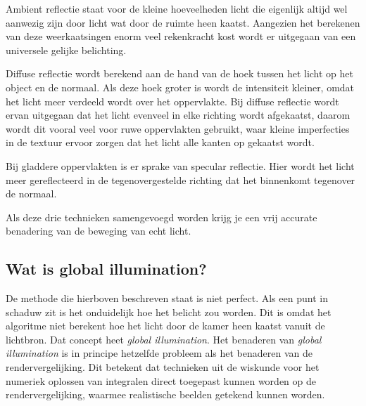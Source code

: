 \documentclass[12pt, a4paper]{article}
\begin{document}
Ambient reflectie staat voor de kleine hoeveelheden licht die eigenlijk altijd wel aanwezig zijn door licht wat door de ruimte heen kaatst. Aangezien het berekenen van deze weerkaatsingen enorm veel rekenkracht kost wordt er uitgegaan van een universele gelijke belichting. 

Diffuse reflectie wordt berekend aan de hand van de hoek tussen het licht op het object en de normaal. Als deze hoek groter is wordt de intensiteit kleiner, omdat het licht meer verdeeld wordt over het oppervlakte. Bij diffuse reflectie wordt ervan uitgegaan dat het licht evenveel in elke richting wordt afgekaatst, daarom wordt dit vooral veel voor ruwe oppervlakten gebruikt, waar kleine imperfecties in de textuur ervoor zorgen dat het licht alle kanten op gekaatst wordt.

Bij gladdere oppervlakten is er sprake van specular reflectie. Hier wordt het licht meer gereflecteerd in de tegenovergestelde richting dat het binnenkomt tegenover de normaal. 

Als deze drie technieken samengevoegd worden krijg je een vrij accurate benadering van de beweging van echt licht.

\subsection{Wat is global illumination?}
De methode die hierboven beschreven staat is niet perfect. Als een punt in schaduw zit is het onduidelijk hoe het belicht zou worden. Dit is omdat het algoritme niet berekent hoe het licht door de kamer heen kaatst vanuit de lichtbron. Dat concept heet \emph{global illumination}. Het benaderen van \emph{global illumination} is in principe hetzelfde probleem als het benaderen van de rendervergelijking. Dit betekent dat technieken uit de wiskunde voor het numeriek oplossen van integralen direct toegepast kunnen worden op de rendervergelijking, waarmee realistische beelden getekend kunnen worden. 
\end{document}
